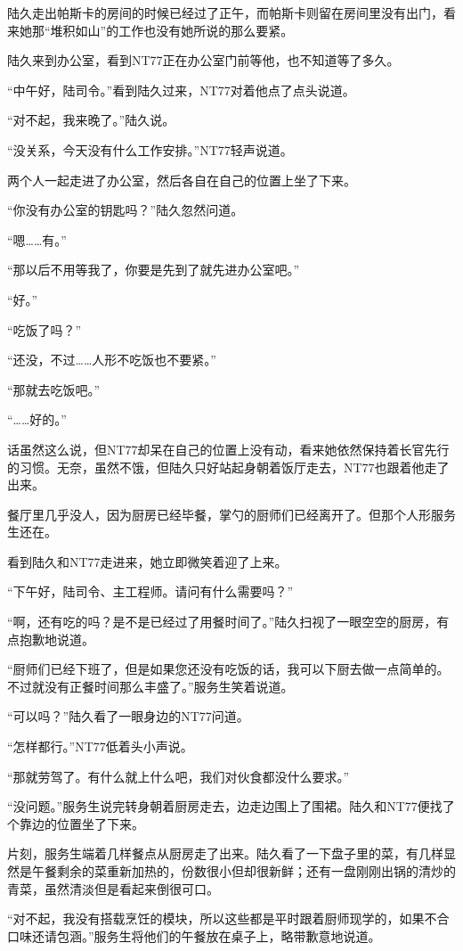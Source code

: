 陆久走出帕斯卡的房间的时候已经过了正午，而帕斯卡则留在房间里没有出门，看来她那“堆积如山”的工作也没有她所说的那么要紧。

陆久来到办公室，看到NT77正在办公室门前等他，也不知道等了多久。

“中午好，陆司令。”看到陆久过来，NT77对着他点了点头说道。

“对不起，我来晚了。”陆久说。

“没关系，今天没有什么工作安排。”NT77轻声说道。

两个人一起走进了办公室，然后各自在自己的位置上坐了下来。

“你没有办公室的钥匙吗？”陆久忽然问道。

“嗯……有。”

“那以后不用等我了，你要是先到了就先进办公室吧。”

“好。”

“吃饭了吗？”

“还没，不过……人形不吃饭也不要紧。”

“那就去吃饭吧。”

“……好的。”

话虽然这么说，但NT77却呆在自己的位置上没有动，看来她依然保持着长官先行的习惯。无奈，虽然不饿，但陆久只好站起身朝着饭厅走去，NT77也跟着他走了出来。

餐厅里几乎没人，因为厨房已经毕餐，掌勺的厨师们已经离开了。但那个人形服务生还在。

看到陆久和NT77走进来，她立即微笑着迎了上来。

“下午好，陆司令、主工程师。请问有什么需要吗？”

“啊，还有吃的吗？是不是已经过了用餐时间了。”陆久扫视了一眼空空的厨房，有点抱歉地说道。

“厨师们已经下班了，但是如果您还没有吃饭的话，我可以下厨去做一点简单的。不过就没有正餐时间那么丰盛了。”服务生笑着说道。

“可以吗？”陆久看了一眼身边的NT77问道。

“怎样都行。”NT77低着头小声说。

“那就劳驾了。有什么就上什么吧，我们对伙食都没什么要求。”

“没问题。”服务生说完转身朝着厨房走去，边走边围上了围裙。陆久和NT77便找了个靠边的位置坐了下来。

片刻，服务生端着几样餐点从厨房走了出来。陆久看了一下盘子里的菜，有几样显然是午餐剩余的菜重新加热的，份数很小但却很新鲜；还有一盘刚刚出锅的清炒的青菜，虽然清淡但是看起来倒很可口。

“对不起，我没有搭载烹饪的模块，所以这些都是平时跟着厨师现学的，如果不合口味还请包涵。”服务生将他们的午餐放在桌子上，略带歉意地说道。

